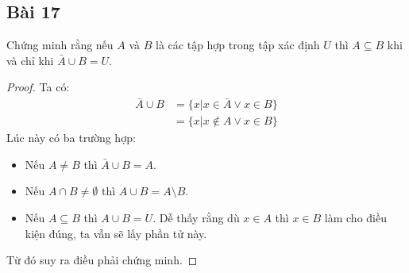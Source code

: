 \subsection*{Bài 17}
Chứng minh rằng nếu $A$ và $B$ là các tập hợp trong tập xác định $U$ thì $A\subseteq B$ khi và chỉ khi $\bar A\cup B=U$.
\begin{proof}
    Ta có:
    \begin{align*}
        \bar A\cup B&=\{x|x\in \bar A\lor x\in B\}\\
        &=\{x|x\notin A\lor x\in B\}
    \end{align*}
    Lúc này có ba trường hợp: \begin{itemize}
        \item Nếu $A\neq B$ thì $\bar A\cup B=A$.
        \item Nếu $A\cap B\neq\emptyset$ thì $A\cup B=A\setminus B$.
        \item Nếu $A\subseteq B$ thì $A\cup B=U$. Dễ thấy rằng dù $x\in A$ thì $x\in B$ làm cho điều kiện đúng, ta vẫn sẽ lấy phần tử này.
    \end{itemize}
    Từ đó suy ra điều phải chứng minh.
\end{proof}
